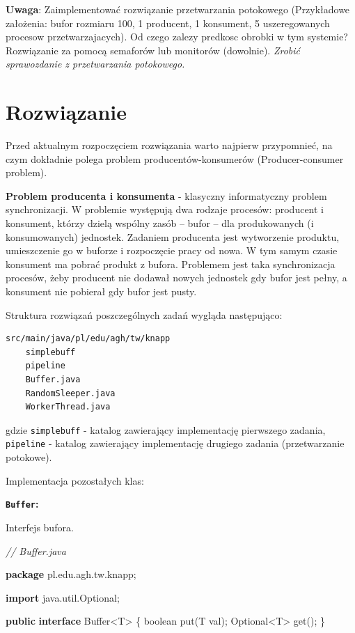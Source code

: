 \documentclass[11pt]{article}
\newenvironment{Shaded}{}{}
\newcommand{\KeywordTok}[1]{\textcolor[rgb]{0.00,0.44,0.13}{\textbf{{#1}}}}
\newcommand{\DataTypeTok}[1]{\textcolor[rgb]{0.56,0.13,0.00}{{#1}}}
\newcommand{\CommentTok}[1]{\textcolor[rgb]{0.38,0.63,0.69}{\textit{{#1}}}}
\newcommand{\FunctionTok}[1]{\textcolor[rgb]{0.02,0.16,0.49}{{#1}}}
\newcommand{\NormalTok}[1]{{#1}}
\newcommand{\ImportTok}[1]{{#1}}
\newcommand{\OperatorTok}[1]{\textcolor[rgb]{0.40,0.40,0.40}{{#1}}}
\newcommand{\BuiltInTok}[1]{{#1}}
\begin{document}
\textbf{Uwaga}: Zaimplementować rozwiązanie przetwarzania potokowego
(Przykładowe założenia: bufor rozmiaru 100, 1 producent, 1 konsument, 5
uszeregowanych procesow przetwarzajacych). Od czego zalezy predkosc
obrobki w tym systemie? Rozwiązanie za pomocą semaforów lub monitorów
(dowolnie). \emph{Zrobić sprawozdanie z przetwarzania potokowego.}

    \hypertarget{rozwiux105zanie}{%
\section{Rozwiązanie}\label{rozwiux105zanie}}

Przed aktualnym rozpoczęciem rozwiązania warto najpierw przypomnieć, na
czym dokładnie polega problem producentów-konsumerów (Producer-consumer
problem).

\textbf{Problem producenta i konsumenta} - klasyczny informatyczny
problem synchronizacji. W problemie występują dwa rodzaje procesów:
producent i konsument, którzy dzielą wspólny zasób -- bufor -- dla
produkowanych (i konsumowanych) jednostek. Zadaniem producenta jest
wytworzenie produktu, umieszczenie go w buforze i rozpoczęcie pracy od
nowa. W tym samym czasie konsument ma pobrać produkt z bufora. Problemem
jest taka synchronizacja procesów, żeby producent nie dodawał nowych
jednostek gdy bufor jest pełny, a konsument nie pobierał gdy bufor jest
pusty.

Struktura rozwiązań poszczególnych zadań wygląda następująco:

\begin{verbatim}
src/main/java/pl/edu/agh/tw/knapp
    simplebuff
    pipeline
    Buffer.java
    RandomSleeper.java
    WorkerThread.java
\end{verbatim}

gdzie \texttt{simplebuff} - katalog zawierający implementację pierwszego
zadania, \texttt{pipeline} - katalog zawierający implementację drugiego
zadania (przetwarzanie potokowe).

Implementacja pozostałych klas:

\textbf{\texttt{Buffer}:}

Interfejs bufora.

\begin{Shaded}
\begin{Highlighting}[]
\CommentTok{// Buffer.java}

\KeywordTok{package}\ImportTok{ pl}\OperatorTok{.}\ImportTok{edu}\OperatorTok{.}\ImportTok{agh}\OperatorTok{.}\ImportTok{tw}\OperatorTok{.}\ImportTok{knapp}\OperatorTok{;}

\KeywordTok{import} \ImportTok{java}\OperatorTok{.}\ImportTok{util}\OperatorTok{.}\ImportTok{Optional}\OperatorTok{;}

\KeywordTok{public} \KeywordTok{interface} \BuiltInTok{Buffer}\OperatorTok{\textless{}}\NormalTok{T}\OperatorTok{\textgreater{}} \OperatorTok{\{}
    \DataTypeTok{boolean} \FunctionTok{put}\OperatorTok{(}\NormalTok{T val}\OperatorTok{);}
\NormalTok{    Optional}\OperatorTok{\textless{}}\NormalTok{T}\OperatorTok{\textgreater{}} \FunctionTok{get}\OperatorTok{();}
\OperatorTok{\}}
\end{Highlighting}
\end{Shaded}
\end{document}
